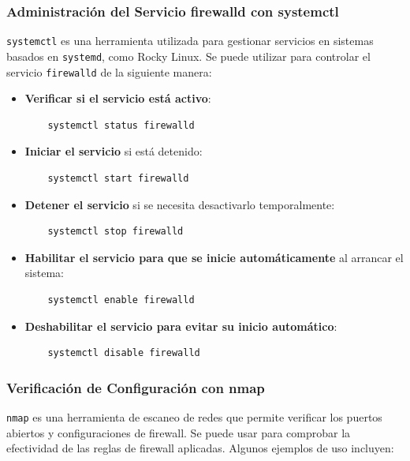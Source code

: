 \subsubsection{Administración del Servicio firewalld con systemctl}

\texttt{systemctl} es una herramienta utilizada para gestionar servicios en sistemas basados en \texttt{systemd}, como Rocky Linux. Se puede utilizar para controlar el servicio \texttt{firewalld} de la siguiente manera:

\begin{itemize}
    \item \textbf{Verificar si el servicio está activo}:
    \begin{verbatim}
    systemctl status firewalld
    \end{verbatim}

    \item \textbf{Iniciar el servicio} si está detenido:
    \begin{verbatim}
    systemctl start firewalld
    \end{verbatim}

    \item \textbf{Detener el servicio} si se necesita desactivarlo temporalmente:
    \begin{verbatim}
    systemctl stop firewalld
    \end{verbatim}

    \item \textbf{Habilitar el servicio para que se inicie automáticamente} al arrancar el sistema:
    \begin{verbatim}
    systemctl enable firewalld
    \end{verbatim}

    \item \textbf{Deshabilitar el servicio para evitar su inicio automático}:
    \begin{verbatim}
    systemctl disable firewalld
    \end{verbatim}
\end{itemize}

\subsubsection{Verificación de Configuración con nmap}

\texttt{nmap} es una herramienta de escaneo de redes que permite verificar los puertos abiertos y configuraciones de firewall. Se puede usar para comprobar la efectividad de las reglas de firewall aplicadas. Algunos ejemplos de uso incluyen:

